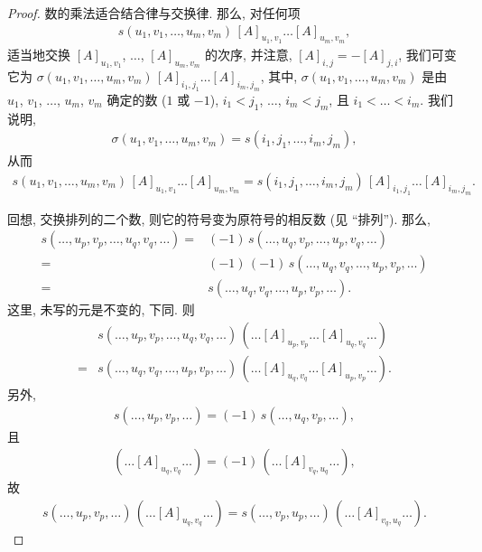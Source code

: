 \documentclass[../libro]{subfiles}
\begin{document}
\begin{proof}
    数的乘法适合结合律与交换律.
    那么, 对任何项
    \begin{align*}
        s(u_1, v_1, \dots, u_m, v_m)\, [A]_{u_1,v_1} \dots [A]_{u_m,v_m},
    \end{align*}
    适当地交换
    \([A]_{u_1,v_1}\), \(\dots\), \([A]_{u_m,v_m}\)
    的次序,
    并注意, \([A]_{i,j} = -[A]_{j,i}\),
    我们可变它为 \(\sigma(u_1, v_1, \dots, u_m, v_m)\,
    [A]_{i_1,j_1} \dots [A]_{i_m,j_m}\),
    其中,
    \(\sigma(u_1, v_1, \dots, u_m, v_m)\)
    是由 \(u_1\), \(v_1\), \(\dots\), \(u_m\), \(v_m\) 确定的数
    (\(1\) 或 \(-1\)),
    \(i_1 < j_1\), \(\dots\), \(i_m < j_m\),
    且 \(i_1 < \dots < i_m\).
    我们说明,
    \begin{align*}
        \sigma(u_1, v_1, \dots, u_m, v_m) = s(i_1, j_1, \dots, i_m, j_m),
    \end{align*}
    从而
    \begin{align*}
        s(u_1, v_1, \dots, u_m, v_m)\, [A]_{u_1,v_1} \dots [A]_{u_m,v_m}
        =
        s(i_1, j_1, \dots, i_m, j_m)\, [A]_{i_1,j_1} \dots [A]_{i_m,j_m}.
    \end{align*}

    回想, 交换排列的二个数, 则它的符号变为原符号的相反数
    (见 ``排列'').
    那么,
    \begin{align*}
        s(\dots, u_p, v_p, \dots, u_q, v_q, \dots)
        = {} &
        (-1)\, s(\dots, u_q, v_p, \dots, u_p, v_q, \dots)
        \\
        = {} &
        (-1)\, (-1)\, s(\dots, u_q, v_q, \dots, u_p, v_p, \dots)
        \\
        = {} &
        s(\dots, u_q, v_q, \dots, u_p, v_p, \dots).
    \end{align*}
    这里, 未写的元是不变的, 下同.
    则
    \begin{align*}
             &
        s(\dots, u_p, v_p, \dots, u_q, v_q, \dots)\,
        (\dots [A]_{u_p,v_p} \dots [A]_{u_q,v_q} \dots)
        \\
        = {} &
        s(\dots, u_q, v_q, \dots, u_p, v_p, \dots)\,
        (\dots [A]_{u_q,v_q} \dots [A]_{u_p,v_p} \dots).
    \end{align*}
    另外,
    \begin{align*}
        s(\dots, u_p, v_p, \dots)
        = (-1)\, s(\dots, u_q, v_p, \dots),
    \end{align*}
    且
    \begin{align*}
        (\dots [A]_{u_q,v_q} \dots)
        = (-1)\, (\dots [A]_{v_q,u_q} \dots),
    \end{align*}
    故
    \begin{align*}
        s(\dots, u_p, v_p, \dots)\, (\dots [A]_{u_q,v_q} \dots)
        = s(\dots, v_p, u_p, \dots)\, (\dots [A]_{v_q,u_q} \dots).
    \end{align*}


\end{proof}
\end{document}

